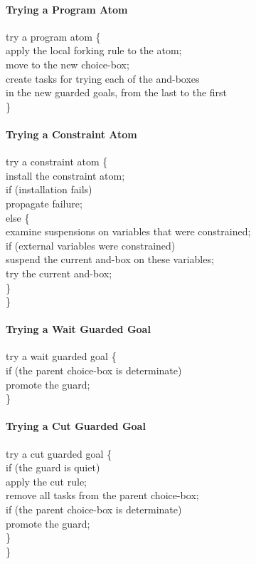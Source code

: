 \paragraph{Trying a Program Atom}
\begin{program}
try a program atom \{\\
\>apply the local forking rule to the atom;\\
\>move to the new choice-box;\\
\>create tasks for trying each of the and-boxes\\
\>\>in the new guarded goals, from the last to the first\\
\}
\end{program}

\paragraph{Trying a Constraint Atom} 
\begin{program}
try a constraint atom \{\\
\>install the constraint atom;\\
\>if (installation fails)\\
\>\>propagate failure;\\
\>else \{\\
\>\>examine suspensions on variables that were constrained;\\
\>\>if (external variables were constrained)\\
\>\>\>suspend the current and-box on these variables;\\
\>\>try the current and-box;\\
\>\}\\
\}
\end{program}

\paragraph{Trying a Wait Guarded Goal}
\begin{program}
try a wait guarded goal \{\\
\>if (the parent choice-box is determinate)\\
\>\>promote the guard;\\
\}
\end{program}

\paragraph{Trying a Cut Guarded Goal}
\begin{program}
try a cut guarded goal \{\\
\>if (the guard is quiet)\\
\>\>apply the cut rule;\\
\>\>remove all tasks from the parent choice-box;\\
\>\>if (the parent choice-box is determinate)\\
\>\>\>promote the guard;\\
\>\}\\
\}
\end{program}


